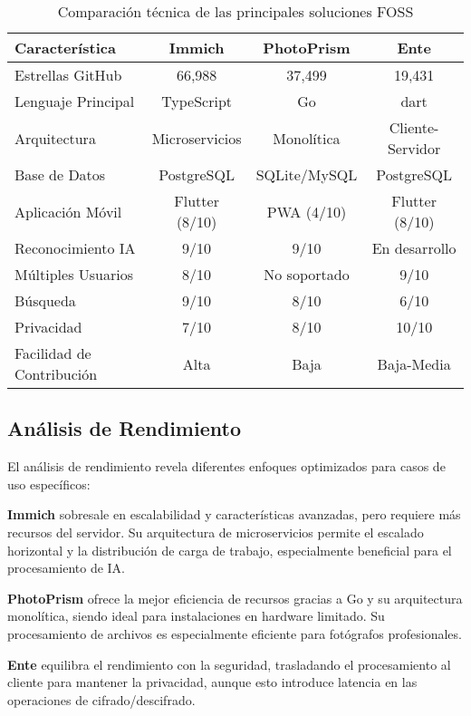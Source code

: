 \begin{table}[H]
\centering
\begin{tabular}{|l|c|c|c|}
\hline
\textbf{Característica} & \textbf{Immich} & \textbf{PhotoPrism} & \textbf{Ente} \\
\hline
Estrellas GitHub & 66,988 & 37,499 & 19,431 \\
Lenguaje Principal & TypeScript & Go & \gls{dart} \\
Arquitectura & Microservicios & Monolítica & Cliente-Servidor \\
Base de Datos & PostgreSQL & SQLite/MySQL & PostgreSQL \\
Aplicación Móvil & Flutter (8/10) & PWA (4/10) & Flutter (8/10) \\
Reconocimiento IA & 9/10 & 9/10 & En desarrollo \\
Múltiples Usuarios & 8/10 & No soportado & 9/10 \\
Búsqueda & 9/10 & 8/10 & 6/10 \\
Privacidad & 7/10 & 8/10 & 10/10 \\
Facilidad de Contribución & Alta & Baja & Baja-Media \\
\hline
\end{tabular}
\caption{Comparación técnica de las principales soluciones FOSS}
\label{tab:tech_comparison}
\end{table}

\subsection{Análisis de Rendimiento}

El análisis de rendimiento revela diferentes enfoques optimizados para casos de uso específicos:

\textbf{Immich} sobresale en escalabilidad y características avanzadas, pero requiere más recursos del servidor. Su arquitectura de microservicios permite el escalado horizontal y la distribución de carga de trabajo, especialmente beneficial para el procesamiento de IA.

\textbf{PhotoPrism} ofrece la mejor eficiencia de recursos gracias a Go y su arquitectura monolítica, siendo ideal para instalaciones en hardware limitado. Su procesamiento de archivos es especialmente eficiente para fotógrafos profesionales.

\textbf{Ente} equilibra el rendimiento con la seguridad, trasladando el procesamiento al cliente para mantener la privacidad, aunque esto introduce latencia en las operaciones de cifrado/descifrado.

